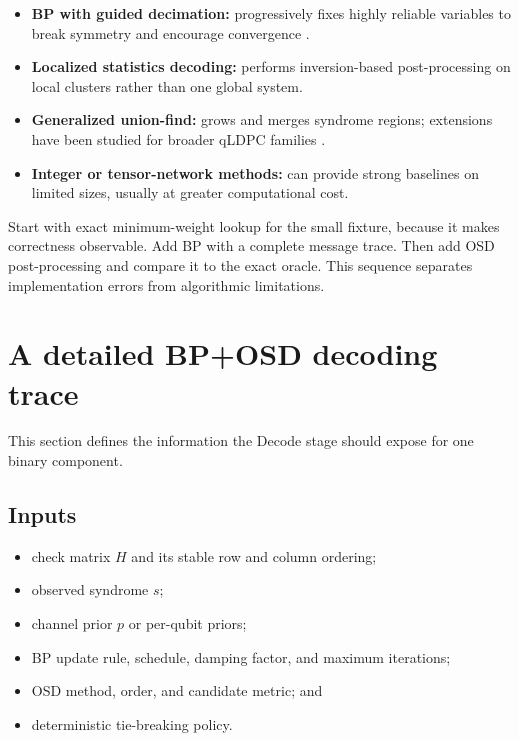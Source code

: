 \documentclass[11pt,letterpaper]{article}
\begin{document}
\begin{itemize}
  \item \textbf{BP with guided decimation:} progressively fixes highly reliable variables to break
  symmetry and encourage convergence \cite{yao-bpgd}.
  \item \textbf{Localized statistics decoding:} performs inversion-based post-processing on local
  clusters rather than one global system.
  \item \textbf{Generalized union-find:} grows and merges syndrome regions; extensions have been
  studied for broader qLDPC families \cite{delfosse-union-find}.
  \item \textbf{Integer or tensor-network methods:} can provide strong baselines on limited sizes,
  usually at greater computational cost.
\end{itemize}

\begin{keyidea}
Start with exact minimum-weight lookup for the small fixture, because it makes correctness
observable. Add BP with a complete message trace. Then add OSD post-processing and compare it to
the exact oracle. This sequence separates implementation errors from algorithmic limitations.
\end{keyidea}

\section{A detailed BP+OSD decoding trace}

This section defines the information the Decode stage should expose for one binary component.

\subsection{Inputs}

\begin{itemize}
  \item check matrix $H$ and its stable row and column ordering;
  \item observed syndrome $s$;
  \item channel prior $p$ or per-qubit priors;
  \item BP update rule, schedule, damping factor, and maximum iterations;
  \item OSD method, order, and candidate metric; and
  \item deterministic tie-breaking policy.
\end{itemize}
\end{document}
